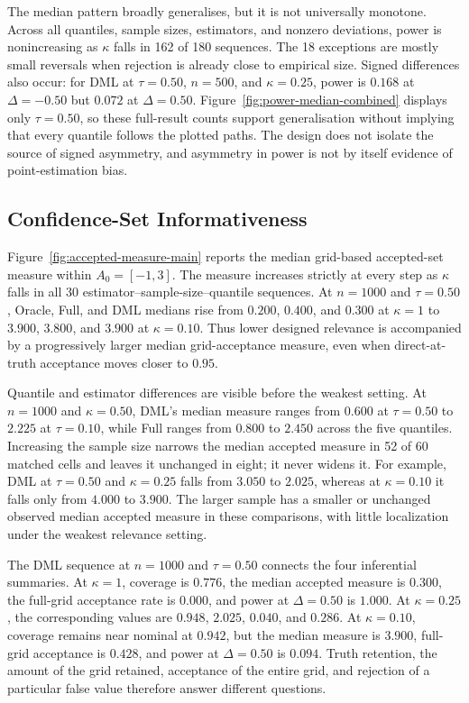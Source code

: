 The median pattern broadly generalises, but it is not universally monotone. Across all quantiles, sample sizes, estimators, and nonzero deviations, power is nonincreasing as $\kappa$ falls in 162 of 180 sequences. The 18 exceptions are mostly small reversals when rejection is already close to empirical size. Signed differences also occur: for DML at $\tau=0.50$, $n=500$, and $\kappa=0.25$, power is $0.168$ at $\Delta=-0.50$ but $0.072$ at $\Delta=0.50$. Figure~\ref{fig:power-median-combined} displays only $\tau=0.50$, so these full-result counts support generalisation without implying that every quantile follows the plotted paths. The design does not isolate the source of signed asymmetry, and asymmetry in power is not by itself evidence of point-estimation bias.

\FloatBarrier

\subsection{Confidence-Set Informativeness}
\label{sec:results-informativeness}

Figure~\ref{fig:accepted-measure-main} reports the median grid-based accepted-set measure within $A_0=[-1,3]$. The measure increases strictly at every step as $\kappa$ falls in all 30 estimator--sample-size--quantile sequences. At $n=1000$ and $\tau=0.50$, Oracle, Full, and DML medians rise from $0.200$, $0.400$, and $0.300$ at $\kappa=1$ to $3.900$, $3.800$, and $3.900$ at $\kappa=0.10$. Thus lower designed relevance is accompanied by a progressively larger median grid-acceptance measure, even when direct-at-truth acceptance moves closer to $0.95$.



Quantile and estimator differences are visible before the weakest setting. At $n=1000$ and $\kappa=0.50$, DML's median measure ranges from $0.600$ at $\tau=0.50$ to $2.225$ at $\tau=0.10$, while Full ranges from $0.800$ to $2.450$ across the five quantiles. Increasing the sample size narrows the median accepted measure in 52 of 60 matched cells and leaves it unchanged in eight; it never widens it. For example, DML at $\tau=0.50$ and $\kappa=0.25$ falls from $3.050$ to $2.025$, whereas at $\kappa=0.10$ it falls only from $4.000$ to $3.900$. The larger sample has a smaller or unchanged observed median accepted measure in these comparisons, with little localization under the weakest relevance setting.

The DML sequence at $n=1000$ and $\tau=0.50$ connects the four inferential summaries. At $\kappa=1$, coverage is $0.776$, the median accepted measure is $0.300$, the full-grid acceptance rate is $0.000$, and power at $\Delta=0.50$ is $1.000$. At $\kappa=0.25$, the corresponding values are $0.948$, $2.025$, $0.040$, and $0.286$. At $\kappa=0.10$, coverage remains near nominal at $0.942$, but the median measure is $3.900$, full-grid acceptance is $0.428$, and power at $\Delta=0.50$ is $0.094$. Truth retention, the amount of the grid retained, acceptance of the entire grid, and rejection of a particular false value therefore answer different questions.

